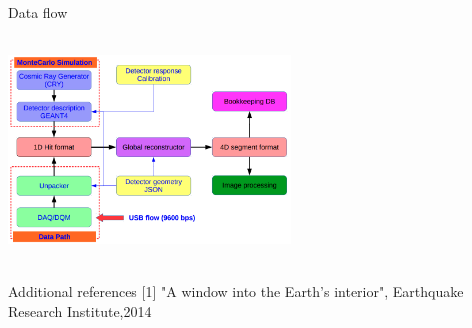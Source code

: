 \documentclass[8 pt]{beamer}
\newcommand{\backupend}{
   \setcounter{framenumber}{\value{finalframe}}
}
\begin{document}
\begin{frame}{Data flow}
\begin{center}
\includegraphics[width=7.5cm, height=6cm]{figs/dataFlow.png}
\end{center}
\end{frame}

\begin{frame}{Additional references}
[1] "A window into the Earth’s interior", Earthquake Research Institute,2014
\end{frame}

\backupend


 
\end{document}
